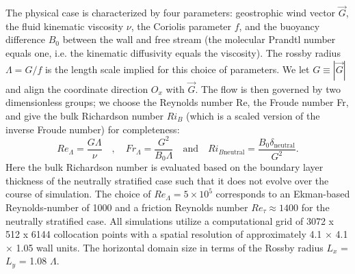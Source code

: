 \documentclass[11pt]{article}
\begin{document}
The physical case is characterized by four parameters: geostrophic wind vector \( \vec{G} \), the
fluid kinematic viscosity \( \nu \), the Coriolis parameter \( f \), 
and the buoyancy difference \( B_0 \) between the wall and free stream 
(the molecular Prandtl number equals one, i.e. the kinematic diffusivity equals the viscosity). 
The rossby radius $\Lambda=G/f$ is the length scale implied for this choice of parameters. 
%
We let \( G \equiv \left|\vec{G}\right| \) and align the coordinate direction \( O_x \) with \( \vec{G} \). 
%
The flow is then governed by two dimensionless groups; we choose the Reynolds number Re, the Froude number Fr, and give 
the bulk Richardson number $Ri_B$ (which is a scaled version of the inverse Froude number) for completeness: 
\begin{equation}
    Re_\Lambda = \frac{G \Lambda}{\nu} \quad,\quad
    Fr_\Lambda=\frac{G^2}{B_0 \Lambda} \quad \text{and}\quad
    Ri_{B\text{neutral}} = \frac{B_0 \delta_\text{neutral}}{G^2}.
\end{equation}
Here the bulk Richardson number is evaluated based on the boundary layer thickness of the neutrally stratified 
case such that it does not evolve over the course of simulation. 
The choice of $Re_\Lambda=5\times10^5$ corresponds to an Ekman-based Reynolds-number of 1000 and a friction 
Reynolds number $Re_{\tau} \approx 1400$ for the neutrally stratified case.  All simulations utilize a computational 
grid of 3072 x 512 x 6144 collocation points with a spatial resolution of approximately 
4.1 × 4.1 × 1.05 wall units. The horizontal domain size in terms of the Rossby radius 
\(L_x\) = \(L_y\) = 1.08 \(\Lambda\). 
\end{document}
